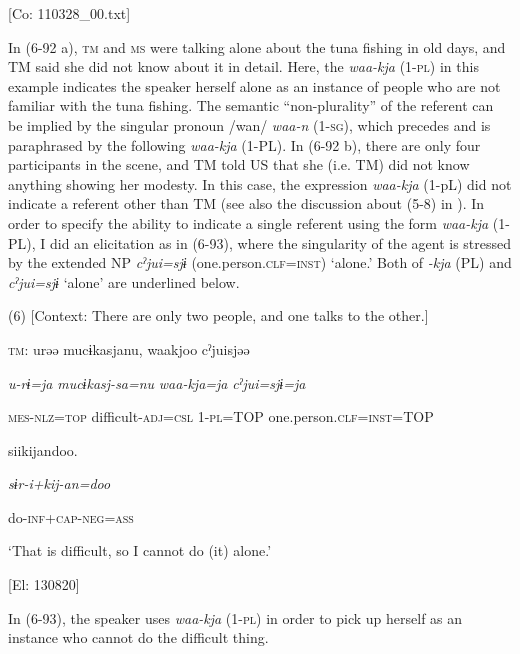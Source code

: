      [Co: 110328\_00.txt]

In (6-92 a), \textsc{tm} and \textsc{ms} were talking alone about the tuna fishing in old days, and TM said she did not know about it in detail. Here, the \textit{waa-kja} (1-\textsc{pl}) in this example indicates the speaker herself alone as an instance of people who are not familiar with the tuna fishing. The semantic “non-plurality” of the referent can be implied by the singular pronoun /wan/ \textit{waa-n} (1-\textsc{sg}), which precedes and is paraphrased by the following \textit{waa-kja} (1-PL). In (6-92 b), there are only four participants in the scene, and TM told US that she (i.e. TM) did not know anything showing her modesty. In this case, the expression \textit{waa-kja} (1-pL) did not indicate a referent other than TM (see also the discussion about (5-8) in ). In order to specify the ability to indicate a single referent using the form \textit{waa-kja} (1-PL), I did an elicitation as in (6-93), where the singularity of the agent is stressed by the extended NP \textit{cˀjui=sjɨ} (one.person.\textsc{clf}=\textsc{inst}) ‘alone.’ Both of \textit{{}-kja} (PL) and \textit{cˀjui=sjɨ} ‘alone’ are underlined below.

(6)  [Context: There are only two people, and one talks to the other.]

  \textsc{tm}:  urəə  mucɨkasjanu,  waakjoo  cˀjuisjəə

    \textit{u-rɨ=ja}  \textit{mucɨkasj-sa=nu}  \textit{waa-kja=ja}  \textit{cˀjui=sjɨ=ja}

    \textsc{mes}-\textsc{nlz}=\textsc{top}  difficult-\textsc{adj}=\textsc{csl}  1-\textsc{pl}=TOP  one.person.\textsc{clf}=\textsc{inst}=TOP

    siikijandoo.

    \textit{sɨr-i+kij-an=doo}

    do-\textsc{inf}+\textsc{cap}-\textsc{neg}=\textsc{ass}

    ‘That is difficult, so I cannot do (it) alone.’

    [El: 130820]

In (6-93), the speaker uses \textit{waa-kja} (1-\textsc{pl}) in order to pick up herself as an instance who cannot do the difficult thing.

